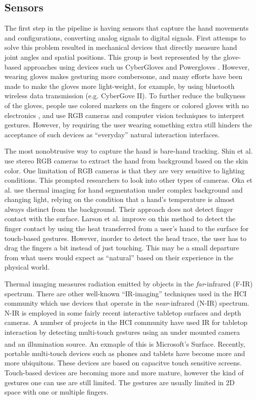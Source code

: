 \subsection{Sensors}
The first step in the pipeline is having sensors that capture the hand movements
and configurations, converting analog signals to digital signals. First attemps
to solve this problem resulted in mechanical devices that directly measure hand
joint angles and spatial positions. This group is best represented by the
glove-based approaches using devices such us CyberGloves \cite{fels09} and
Powergloves \cite{kadous02}. However, wearing gloves makes gesturing more
combersome, and many efforts have been made to make the gloves more
light-weight, for example, by using bluetooth wireless data transmission (e.g.
CyberGove II). To further reduce the bulkyness of the gloves, people use colored markers on the fingers
\cite{mistry09} or colored gloves with no electronics \cite{Wang09}, and use RGB
cameras and computer vision techniques to interpret gestures. However, by
requiring the user wearing something extra still hinders the acceptance of
such devices as ``everyday'' natural interaction interfaces. 

The most nonobtrusive way to capture the hand is bare-hand tracking. Shin et al. \cite{Shin04} use
stereo RGB cameras to extract the hand from background based on the skin color. One
limitation of RGB cameras is that they are very sensitive to lighting
conditions. This prompted researchers to look into other types of cameras. Oka et al. 
\cite{Oka02} use thermal imaging for hand segmentation under complex
background and changing light, relying on the condition that a hand's
temperature is almost always distinct from the background. Their approach does
not detect finger contact with the surface. Larson et al. \cite{larson11}
improve on this method to detect the finger contact by using
the heat transferred from a user's hand to the surface for touch-based gestures.
However, inorder to detect the head trace, the user has to drag the fingers a
bit instead of just touching. This may be a small departure from what users
would expect as ``natural'' based on their experience in the physical world.

Thermal imaging measures radiation emitted by objects in the
\textit{far}-infrared (F-IR) spectrum. There are other well-known ``IR-imaging''
techniques used in the HCI community which use devices that operate in the \textit{near}-infrared (N-IR) spectrum.
N-IR is employed in some fairly recent interactive tabletop surfaces and depth
cameras. A number of projects in the HCI community have used IR for tabletop
interaction by detecting multi-touch gestures using an under mounted
camera and an illumination source. An exmaple of this is Microsoft's 
Surface\textsuperscript{\textregistered}. Recently, portable multi-touch devices
such as phones and tablets have become more and more ubiquitous. These devices
are based on capacitve touch sensitive screens. Touch-based devices are becoming
more and more mature, however the kind of gestures one can use are still
limited. The gestures are usually limited in 2D space with one or multiple
fingers. 

